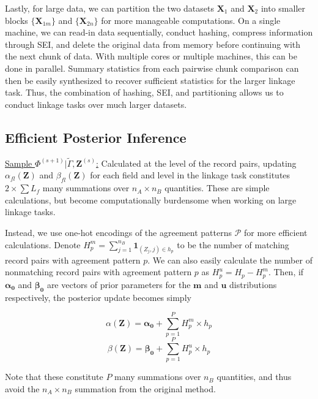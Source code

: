 \documentclass[12pt,letterpaper]{article}
\newcommand{\1}[1]{\mathbb{I}\!\left[#1\right]} %
\begin{document}
Lastly, for large data, we can partition the two datasets \(\bm{X}_1\) and
\(\bm{X}_2\) into smaller blocks \(\{\bm{X}_{1m}\}\) and \(\{\bm{X}_{2n}\}\) for more
manageable computations. On a single machine, we can read-in data
sequentially, conduct hashing, compress information through SEI, and
delete the original data from memory before continuing with the next
chunk of data. With multiple cores or multiple machines, this can be
done in parallel. Summary statistics from each pairwise chunk comparison can then be easily synthesized to recover sufficient statistics for the larger linkage task.  Thus, the combination of hashing, SEI, and partitioning
allows us to conduct linkage tasks over much larger datasets.

\hypertarget{efficient-posterior}{%
	\subsection{Efficient Posterior Inference }\label{efficient-posterior}}

\underline{Sample $\Phi^{(s+1)}|\tilde{\Gamma}, \mathbf{Z}^{(s)}$:} Calculated at the level of the record pairs, updating  \(\alpha_{fl}(\mathbf{Z})\) and \(\beta_{fl}(\mathbf{Z})\) for each field and level in the linkage task constitutes \(2 \times \sum L_f\) many summations over \(n_A \times n_B\) quantities. These are simple calculations, but become computationally burdensome when working on large linkage tasks. 

Instead, we use one-hot encodings of the agreement patterns $\mathcal{P}$ for more efficient calculations. Denote
$H_p^m = \sum_{j=1}^{n_B} \mathbf{1}_{(Z_j, j) \in h_p}$ to be the
number of matching record pairs with agreement pattern $p$. We can also easily calculate the number of nonmatching record pairs with agreement pattern $p$ as \(H_p^u = H_p - H_p^m\). Then, if $\mathbf{\alpha_0}$ and $\mathbf{\beta_0}$ are vectors of prior parameters for the $\mathbf{m}$ and $\mathbf{u}$ distributions respectively, the posterior update becomes simply

$$\alpha(\mathbf{Z}) = \bm{\alpha_0} + \sum_{p=1}^P H_p^m \times h_p$$
$$\beta(\mathbf{Z}) = \bm{\beta_0} + \sum_{p=1}^P H_p^u \times h_p$$

Note that these constitute \(P\) many summations over \(n_B\) quantities, and thus avoid the \(n_A \times n_B\) summation from the original method.
\end{document}
